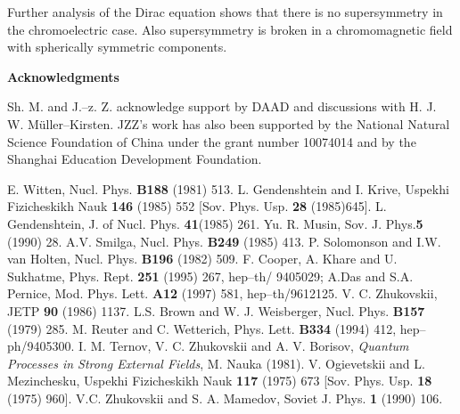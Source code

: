 \documentclass[a4paper,12pt,a4]{article}
\begin{document}
Further analysis of the Dirac equation shows that there is no
supersymmetry in the chromoelectric case. Also supersymmetry is
broken in a chromomagnetic field with spherically
symmetric components.


\vspace{0.4cm}



\noindent
{\bf Acknowledgments}

Sh. M. and J.--z. Z. acknowledge
 support by DAAD 
and discussions with H. J. W. M\"uller--Kirsten. JZZ's work has also been 
supported by the National Natural Science 
Foundation of China under the grant number 10074014 and by the Shanghai 
Education Development Foundation.

\vspace{0.5cm}
\clearpage
\begin{thebibliography}{99}
 E. Witten, Nucl. Phys. {\bf B188} (1981) 513. 
 L. Gendenshtein and I. Krive, Uspekhi Fizicheskikh Nauk
{\bf 146} (1985) 552 [Sov. Phys. Usp. {\bf 28} (1985)645].
 L. Gendenshtein, J. of Nucl. Phys. {\bf 41}(1985) 261.
 Yu. R. Musin, Sov. J. Phys.{\bf 5} (1990) 28.
 A.V. Smilga,
Nucl. Phys. {\bf B249} (1985) 413.
 P. Solomonson and I.W. van Holten, Nucl. Phys. {\bf B196} (1982)
509.
 F. Cooper, A. Khare and U. Sukhatme, Phys. Rept.
{\bf 251} (1995) 267, hep--th/
9405029;
A.Das and S.A. Pernice,
Mod. Phys. Lett. {\bf A12} (1997) 581, hep--th/9612125.
 V. C. Zhukovskii, JETP {\bf 90} (1986) 1137.
 L.S. Brown and W. J. Weisberger, Nucl. Phys. {\bf B157}
(1979) 285. 
 M. Reuter and C. Wetterich,
Phys. Lett. {\bf B334} (1994) 412, 
hep--ph/9405300.
 I. M. Ternov, V. C.  Zhukovskii and A. V. Borisov,
{\it Quantum Processes in Strong External Fields}, M. Nauka (1981). 
 V. Ogievetskii and
L. Mezinchesku, Uspekhi Fizicheskikh Nauk {\bf 117} 
(1975) 673 [Sov. Phys. Usp. {\bf 18} (1975) 960].
 V.C. Zhukovskii and S. A. Mamedov,
Soviet J. Phys. {\bf 1} (1990) 106.


\end{thebibliography}
\end{document}
